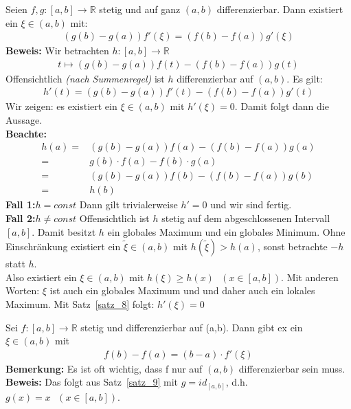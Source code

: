 
\begin{Satz}{
	\label{satz_9}
	Seien $f,g : [a,b] \rightarrow \mathbb{R}$ stetig und auf ganz 
	$\left( a, b \right)$ differenzierbar. Dann existiert ein 
	$\xi \in (a,b) $ mit:
	\begin{align*}
		\left( g(b)- g(a)\right)f'(\xi) = 
		\left( f(b) - f(a) \right) g'(\xi)
	\end{align*}
	\textbf{Beweis:} Wir betrachten $h: [a,b] \rightarrow \mathbb{R}$ 
	\begin{align*}
		t \mapsto \left( g(b) -g(a)\right)f(t) - \left(f(b)-f(a)\right)g(t)
	\end{align*}
	Offensichtlich \textit{(nach Summenregel)} ist $h$ differenzierbar auf $(a,b)$.
	Es gilt:
	\begin{align*}
		h'(t) = \left(g(b)-g(a)\right)f'(t) - \left(f(b)-f(a)\right)g'(t)
	\end{align*}
	Wir zeigen: es existiert ein $\xi \in (a,b)$ mit $h'(\xi) = 0$. Damit folgt 
	dann die Aussage. \\
	\textbf{Beachte:} 
	\begin{align*}
		h(a) = & \left(g(b)-g(a)\right)f(a) - \left(f(b)-f(a)\right)g(a) \\
		= & g(b) \cdot f(a) - f(b) \cdot g(a) \\
		= & \left(g(b) - g(a)\right)f(b) - \left(f(b)-f(a)\right)g(b) \\
		= & h(b)
	\end{align*}
	\textbf{Fall 1:}$h = const$ Dann gilt trivialerweise $h' = 0$ 
	und wir sind fertig. \\
	\textbf{Fall 2:}$h \neq const$ Offensichtlich ist $h$ stetig auf dem 
	abgeschlossenen Intervall $[a,b]$. Damit besitzt $h$ ein globales Maximum und 
	ein globales Minimum. Ohne Einschränkung existiert ein $\tilde{\xi} \in (a,b)$
	 mit $h(\tilde{\xi}) > h(a)$, sonst betrachte $-h$ statt $h$. \\
	 Also existiert ein $\xi \in (a,b)$ mit $h(\xi) \geq h(x)\textbf{ }
	  (x \in [a,b])$. 
	 Mit anderen Worten: $\xi$ ist auch ein globales Maximum und und daher auch 
	 ein lokales Maximum. Mit Satz~\ref{satz_8}
	 folgt: $h'(\xi) = 0$
	 
}\end{Satz}
	
\begin{Satz}{\label{vl_07_MWS}
	Sei $f: [a,b] \rightarrow \mathbb{R}$ stetig und differenzierbar auf 
	(a,b). Dann gibt ex ein $\xi \in (a,b)$ mit 
	\begin{align*}
		f(b) -f(a) = (b-a) \cdot f'(\xi)
	\end{align*}
	\textbf{Bemerkung:} Es ist oft wichtig, dass f nur auf $(a,b)$ differenzierbar 
	sein muss. \\
	\textbf{Beweis:} Das folgt aus Satz~\ref{satz_9}
	mit $g = id_{[a,b]}$, d.h. $g(x) = x \textbf{ } (x \in [a,b])$.
}\end{Satz}

